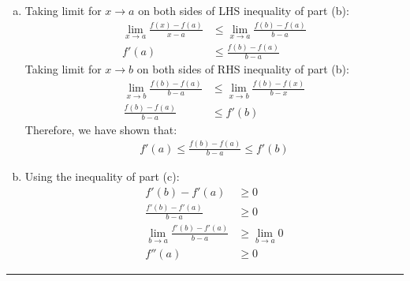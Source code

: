 \documentclass[12pt, letterpaper, twoside]{article}
\begin{document}
\begin{enumerate}[(a)]
    \item Taking limit for $x\rightarrow a$ on both sides of LHS inequality of part (b):
    \begin{align*}
        \lim_{x\rightarrow a}\frac{f(x)-f(a)}{x-a}&\leq\lim_{x\rightarrow a}\frac{f(b)-f(a)}{b-a}\\
        f'(a)&\leq\frac{f(b)-f(a)}{b-a}
    \end{align*}
    Taking limit for $x\rightarrow b$ on both sides of RHS inequality of part (b):
    \begin{align*}
        \lim_{x\rightarrow b}\frac{f(b)-f(a)}{b-a}&\leq\lim_{x\rightarrow b}\frac{f(b)-f(x)}{b-x}\\
        \frac{f(b)-f(a)}{b-a}&\leq f'(b)
    \end{align*}
    Therefore, we have shown that:
    \begin{align*}
        f'(a)\leq\frac{f(b)-f(a)}{b-a}\leq f'(b)
    \end{align*}

    \item Using the inequality of part (c):
    \begin{align*}
        f'(b)-f'(a)&\geq0\\
        \frac{f'(b)-f'(a)}{b-a}&\geq0\\
        \lim_{b\rightarrow a}\frac{f'(b)-f'(a)}{b-a}&\geq\lim_{b\rightarrow a}0\\
        f''(a)&\geq0
    \end{align*}
\end{enumerate}
\hrule
\end{document}
